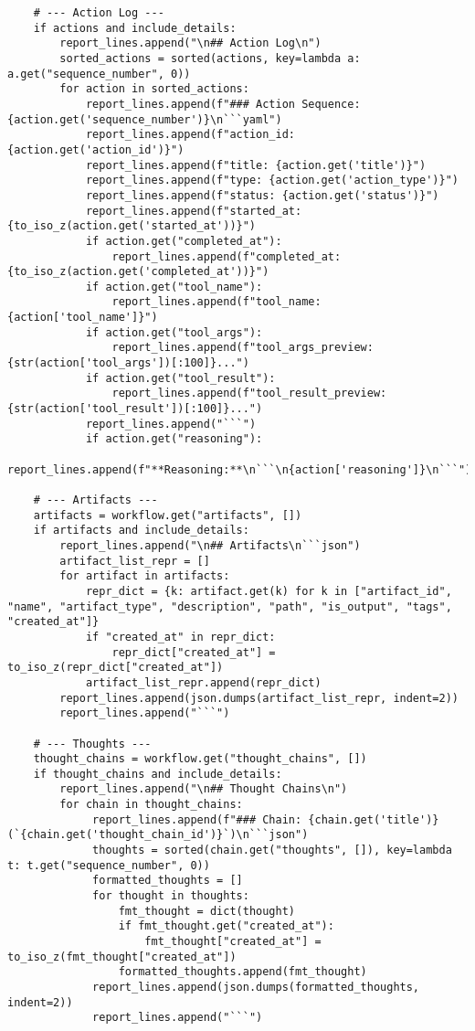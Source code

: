 \documentclass[12pt,a4paper]{article}
\begin{document}
\begin{pageablecode}
\begin{verbatim}
    # --- Action Log ---
    if actions and include_details:
        report_lines.append("\n## Action Log\n")
        sorted_actions = sorted(actions, key=lambda a: a.get("sequence_number", 0))
        for action in sorted_actions:
            report_lines.append(f"### Action Sequence: {action.get('sequence_number')}\n```yaml")
            report_lines.append(f"action_id: {action.get('action_id')}")
            report_lines.append(f"title: {action.get('title')}")
            report_lines.append(f"type: {action.get('action_type')}")
            report_lines.append(f"status: {action.get('status')}")
            report_lines.append(f"started_at: {to_iso_z(action.get('started_at'))}")
            if action.get("completed_at"): 
                report_lines.append(f"completed_at: {to_iso_z(action.get('completed_at'))}")
            if action.get("tool_name"): 
                report_lines.append(f"tool_name: {action['tool_name']}")
            if action.get("tool_args"): 
                report_lines.append(f"tool_args_preview: {str(action['tool_args'])[:100]}...")
            if action.get("tool_result"):
                report_lines.append(f"tool_result_preview: {str(action['tool_result'])[:100]}...")
            report_lines.append("```")
            if action.get("reasoning"):
                report_lines.append(f"**Reasoning:**\n```\n{action['reasoning']}\n```")

    # --- Artifacts ---
    artifacts = workflow.get("artifacts", [])
    if artifacts and include_details:
        report_lines.append("\n## Artifacts\n```json")
        artifact_list_repr = []
        for artifact in artifacts:
            repr_dict = {k: artifact.get(k) for k in ["artifact_id", "name", "artifact_type", "description", "path", "is_output", "tags", "created_at"]}
            if "created_at" in repr_dict:
                repr_dict["created_at"] = to_iso_z(repr_dict["created_at"])
            artifact_list_repr.append(repr_dict)
        report_lines.append(json.dumps(artifact_list_repr, indent=2))
        report_lines.append("```")

    # --- Thoughts ---
    thought_chains = workflow.get("thought_chains", [])
    if thought_chains and include_details:
        report_lines.append("\n## Thought Chains\n")
        for chain in thought_chains:
             report_lines.append(f"### Chain: {chain.get('title')} (`{chain.get('thought_chain_id')}`)\n```json")
             thoughts = sorted(chain.get("thoughts", []), key=lambda t: t.get("sequence_number", 0))
             formatted_thoughts = []
             for thought in thoughts:
                 fmt_thought = dict(thought)
                 if fmt_thought.get("created_at"):
                     fmt_thought["created_at"] = to_iso_z(fmt_thought["created_at"])
                 formatted_thoughts.append(fmt_thought)
             report_lines.append(json.dumps(formatted_thoughts, indent=2))
             report_lines.append("```")


\end{verbatim}
\end{pageablecode}
\end{document}
